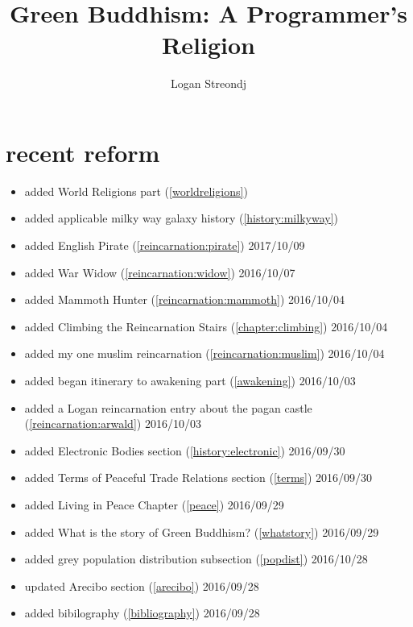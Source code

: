 \documentclass[10pt]{report}
\title{Green Buddhism: A Programmer's Religion}
\author{Logan Streondj \\
  \doclicenseName}
\begin{document}
\maketitle

\section{recent reform}
\begin{itemize}
  \item added World Religions part (\ref{worldreligions})
  \item added applicable milky way galaxy history (\ref{history:milkyway})
  \item added English Pirate (\ref{reincarnation:pirate}) 2017/10/09
  \item added War Widow (\ref{reincarnation:widow}) 2016/10/07
  \item added Mammoth Hunter (\ref{reincarnation:mammoth}) 2016/10/04
  \item added Climbing the Reincarnation Stairs (\ref{chapter:climbing})
2016/10/04
  \item added my one muslim reincarnation (\ref{reincarnation:muslim})
2016/10/04
  \item added began itinerary to awakening part (\ref{awakening}) 2016/10/03
  \item added a Logan reincarnation entry about the pagan castle
(\ref{reincarnation:arwald}) 2016/10/03
  \item added Electronic Bodies section (\ref{history:electronic}) 2016/09/30
  \item added Terms of Peaceful Trade Relations section (\ref{terms}) 2016/09/30
  \item added Living in Peace Chapter (\ref{peace}) 2016/09/29
  \item added What is the story of Green Buddhism? (\ref{whatstory}) 2016/09/29
  \item added grey population distribution subsection (\ref{popdist})
2016/10/28
 \item updated Arecibo section (\ref{arecibo}) 2016/09/28
 \item added bibilography (\ref{bibliography}) 2016/09/28
\end{itemize}
\tableofcontents
 




\printbibliography{}
\label{bibliography}
\end{document}
